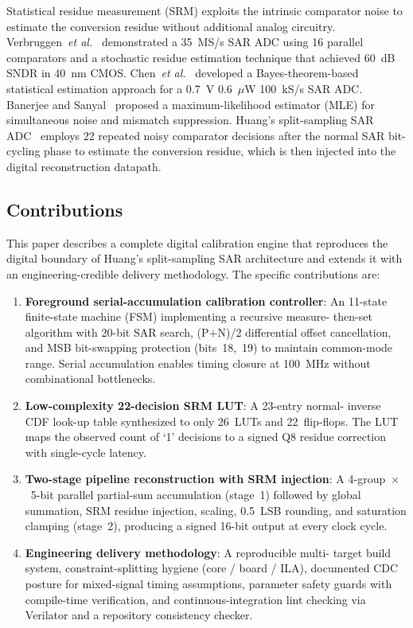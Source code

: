 \documentclass[journal]{IEEEtran}
\begin{document}
Statistical residue measurement (SRM) exploits the intrinsic comparator noise
to estimate the conversion residue without additional analog circuitry.
Verbruggen~\textit{et al.}~\cite{verbruggen_jssc_2015} demonstrated a 35~MS/s
SAR ADC using 16 parallel comparators and a stochastic residue estimation
technique that achieved 60~dB SNDR in 40~nm CMOS. Chen~\textit{et al.}~\cite{
chen_jssc_2017} developed a Bayes-theorem-based statistical estimation
approach for a 0.7~V 0.6~$\mu$W 100~kS/s SAR ADC. Banerjee and Sanyal~\cite{
banerjee_el_2017} proposed a maximum-likelihood estimator (MLE) for
simultaneous noise and mismatch suppression. Huang's split-sampling SAR
ADC~\cite{huang_jssc_2025} employs 22 repeated noisy comparator decisions
after the normal SAR bit-cycling phase to estimate the conversion residue,
which is then injected into the digital reconstruction datapath.

\subsection{Contributions}

This paper describes a complete digital calibration engine that reproduces the
digital boundary of Huang's split-sampling SAR architecture and extends it
with an engineering-credible delivery methodology. The specific contributions
are:

\begin{enumerate}
    \item \textbf{Foreground serial-accumulation calibration controller}: An
        11-state finite-state machine (FSM) implementing a recursive measure-
        then-set algorithm with 20-bit SAR search, (P+N)/2 differential offset
        cancellation, and MSB bit-swapping protection (bits~18,~19) to maintain
        common-mode range. Serial accumulation enables timing closure at
        100~MHz without combinational bottlenecks.
    \item \textbf{Low-complexity 22-decision SRM LUT}: A 23-entry normal-
        inverse CDF look-up table synthesized to only 26~LUTs and 22~flip-flops.
        The LUT maps the observed count of `1' decisions to a signed Q8 residue
        correction with single-cycle latency.
    \item \textbf{Two-stage pipeline reconstruction with SRM injection}: A
        4-group~$\times$~5-bit parallel partial-sum accumulation (stage~1)
        followed by global summation, SRM residue injection, scaling, 0.5~LSB
        rounding, and saturation clamping (stage~2), producing a signed 16-bit
        output at every clock cycle.
    \item \textbf{Engineering delivery methodology}: A reproducible multi-
        target build system, constraint-splitting hygiene (core / board / ILA),
        documented CDC posture for mixed-signal timing assumptions, parameter
        safety guards with compile-time verification, and continuous-integration
        lint checking via Verilator and a repository consistency checker.
\end{enumerate}
\end{document}
